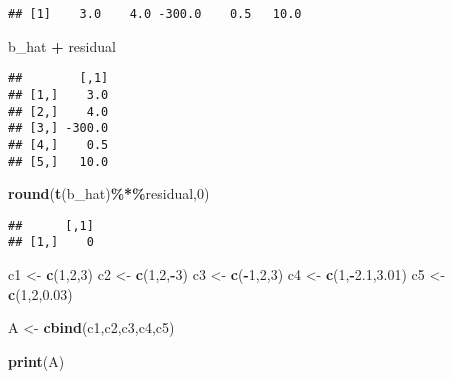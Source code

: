 \documentclass[
]{article}
\newenvironment{Shaded}{\begin{snugshade}}{\end{snugshade}}
\newcommand{\DecValTok}[1]{\textcolor[rgb]{0.00,0.00,0.81}{#1}}
\newcommand{\FloatTok}[1]{\textcolor[rgb]{0.00,0.00,0.81}{#1}}
\newcommand{\FunctionTok}[1]{\textcolor[rgb]{0.13,0.29,0.53}{\textbf{#1}}}
\newcommand{\NormalTok}[1]{#1}
\newcommand{\OtherTok}[1]{\textcolor[rgb]{0.56,0.35,0.01}{#1}}
\newcommand{\SpecialCharTok}[1]{\textcolor[rgb]{0.81,0.36,0.00}{\textbf{#1}}}
\begin{document}
\begin{verbatim}
## [1]    3.0    4.0 -300.0    0.5   10.0
\end{verbatim}

\begin{Shaded}
\begin{Highlighting}[]
\NormalTok{b\_hat }\SpecialCharTok{+}\NormalTok{ residual}
\end{Highlighting}
\end{Shaded}

\begin{verbatim}
##        [,1]
## [1,]    3.0
## [2,]    4.0
## [3,] -300.0
## [4,]    0.5
## [5,]   10.0
\end{verbatim}

\begin{Shaded}
\begin{Highlighting}[]
\FunctionTok{round}\NormalTok{(}\FunctionTok{t}\NormalTok{(b\_hat)}\SpecialCharTok{\%*\%}\NormalTok{residual,}\DecValTok{0}\NormalTok{)}
\end{Highlighting}
\end{Shaded}

\begin{verbatim}
##      [,1]
## [1,]    0
\end{verbatim}

\begin{Shaded}
\begin{Highlighting}[]
\NormalTok{c1 }\OtherTok{\textless{}{-}} \FunctionTok{c}\NormalTok{(}\DecValTok{1}\NormalTok{,}\DecValTok{2}\NormalTok{,}\DecValTok{3}\NormalTok{)}
\NormalTok{c2 }\OtherTok{\textless{}{-}} \FunctionTok{c}\NormalTok{(}\DecValTok{1}\NormalTok{,}\DecValTok{2}\NormalTok{,}\SpecialCharTok{{-}}\DecValTok{3}\NormalTok{)}
\NormalTok{c3 }\OtherTok{\textless{}{-}} \FunctionTok{c}\NormalTok{(}\SpecialCharTok{{-}}\DecValTok{1}\NormalTok{,}\DecValTok{2}\NormalTok{,}\DecValTok{3}\NormalTok{)}
\NormalTok{c4 }\OtherTok{\textless{}{-}} \FunctionTok{c}\NormalTok{(}\DecValTok{1}\NormalTok{,}\SpecialCharTok{{-}}\FloatTok{2.1}\NormalTok{,}\FloatTok{3.01}\NormalTok{)}
\NormalTok{c5 }\OtherTok{\textless{}{-}} \FunctionTok{c}\NormalTok{(}\DecValTok{1}\NormalTok{,}\DecValTok{2}\NormalTok{,}\FloatTok{0.03}\NormalTok{)}

\NormalTok{A }\OtherTok{\textless{}{-}} \FunctionTok{cbind}\NormalTok{(c1,c2,c3,c4,c5)}

\FunctionTok{print}\NormalTok{(A)}
\end{Highlighting}
\end{Shaded}
\end{document}
